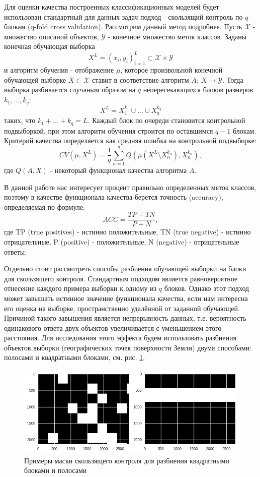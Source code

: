 \documentclass[14pt]{extarticle}
\begin{document}
\par
Для оценки качества построенных классификационных моделей будет использован стандартный
для данных задач подход - скользящий контроль по $q$ блокам (q-fold cross validation).
Рассмотрим данный метод подробнее. 
Пусть $\mathcal{X}$ - множество описаний объектов, 
$\mathcal{Y}$ - конечное множество меток классов. Заданы конечная обучающая выборка
\[
    X^L=(x_i, y_i)_{i=1}^L \subset \mathcal{X} \times \mathcal{Y} 
\]
и алгоритм обучения - отображение $\mu$, которое
произвольной конечной обучающей выборке $X \subset \mathcal{X}$
ставит в соответствие алгоритм $A:\ X \to \mathcal{Y}$.
Тогда выборка разбивается случаным образом на $q$ непересекающихся блоков размеров
$k_1,...,k_q$:
\[
    X^L=X_1^{k_1} \cup ... \cup X_q^{k_q}
\]
таких, что $k_1+...+k_q=L$. Каждый блок по очереди становится контрольной подвыборкой,
при этом алгоритм обучения строится по оставшимся $q-1$ блокам. Критерий качества
определяется как средняя ошибка на контрольной подвыборке:
\[
    CV(\mu, X^L)=\frac{1}{q}\sum_{n=1}^q Q(\mu(X^L \setminus X_n^{k_n}),X_n^{k_n}),
\]
где $Q(A, X)$ - некоторый функционал качества алгоритма $A$.
\par
В данной работе нас интересует процент правильно определенных меток классов,
поэтому в качестве функционала качества берется точность (accuracy),
определяемая по формуле:
\[
    ACC=\frac{TP+TN}{P+N},
\]
где TP (true positives) - истинно положительные, TN (true negative) - истинно отрицательные,
P (positive) - положительные, N (negative) - отрицательные ответы.
\par
Отдельно стоит рассмотреть способы разбиения обучающей выборки на блоки для скользящего
контроля. Стандартным подходом является равновероятное отнесение каждого примера выборки
к одному из $q$ блоков. Однако этот подход может завышать истинное значение функционала
качества, если нам интересна его оценка на выборке, пространственно удалённой от заданной
обучающей. Причиной такого завышения является непрерывность данных, т.е. вероятность 
одинакового ответа двух объектов увеличивается с уменьшением этого расстояния.
Для исследования этого эффекта будем использовать разбиения объектов выборки
(географических точек поверхности Земли) двумя способами: полосами и квадратными блоками,
см. рис. \ref{image:val_masks}. 
\begin{figure}[H]
\centering
\includegraphics[width=\linewidth]{imgs/validation_masks.png}
\caption{Примеры маски скользящего контроля для разбиения квадратными блоками и полосами}
\label{image:val_masks}
\end{figure}
\end{document}
